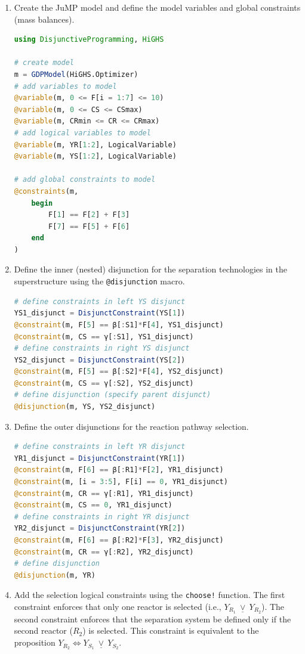 \documentclass{juliacon}
\begin{document}
\begin{enumerate}
    \item Create the JuMP model and define the model variables and global constraints (mass balances).
    
\begin{lstlisting}[language = Julia]
using DisjunctiveProgramming, HiGHS

# create model
m = GDPModel(HiGHS.Optimizer)
# add variables to model
@variable(m, 0 <= F[i = 1:7] <= 10)
@variable(m, 0 <= CS <= CSmax)
@variable(m, CRmin <= CR <= CRmax)
# add logical variables to model
@variable(m, YR[1:2], LogicalVariable)
@variable(m, YS[1:2], LogicalVariable)

# add global constraints to model
@constraints(m,
    begin
        F[1] == F[2] + F[3]
        F[7] == F[5] + F[6]
    end
)
\end{lstlisting}
    \item Define the inner (nested) disjunction for the separation technologies in the superstructure using the \verb|@disjunction| macro.   
\begin{lstlisting}[language = Julia]
# define constraints in left YS disjunct
YS1_disjunct = DisjunctConstraint(YS[1])
@constraint(m, F[5] == β[:S1]*F[4], YS1_disjunct)
@constraint(m, CS == γ[:S1], YS1_disjunct)
# define constraints in right YS disjunct
YS2_disjunct = DisjunctConstraint(YS[2])
@constraint(m, F[5] == β[:S2]*F[4], YS2_disjunct)
@constraint(m, CS == γ[:S2], YS2_disjunct)
# define disjunction (specify parent disjunct)
@disjunction(m, YS, YS2_disjunct)
\end{lstlisting}
    \item Define the outer disjunctions for the reaction pathway selection.
\begin{lstlisting}[language = Julia]
# define constraints in left YR disjunct
YR1_disjunct = DisjunctConstraint(YR[1])
@constraint(m, F[6] == β[:R1]*F[2], YR1_disjunct)
@constraint(m, [i = 3:5], F[i] == 0, YR1_disjunct)
@constraint(m, CR == γ[:R1], YR1_disjunct)
@constraint(m, CS == 0, YR1_disjunct)
# define constraints in right YR disjunct
YR2_disjunct = DisjunctConstraint(YR[2])
@constraint(m, F[6] == β[:R2]*F[3], YR2_disjunct)
@constraint(m, CR == γ[:R2], YR2_disjunct)  
# define disjunction
@disjunction(m, YR)    
\end{lstlisting}
    \item Add the selection logical constraints using the \verb|choose!| function. The first constraint enforces that only one reactor is selected (i.e., $Y_{R_1} \ \underline{\vee} \ Y_{R_2}$). The second constraint enforces that the separation system be defined only if the second reactor ($R_2$) is selected. This constraint is equivalent to the proposition $Y_{R_2} \Leftrightarrow Y_{S_1} \ \underline{\vee} \ Y_{S_2}$.

\end{enumerate}
\end{document}
